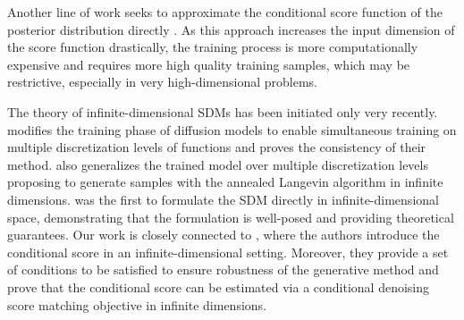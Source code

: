 \documentclass[10pt]{article} %
\theoremstyle{plain}
\theoremstyle{definition}
\theoremstyle{remark}
\begin{document}
Another line of work seeks to approximate the conditional score function of the posterior distribution directly \cite{saharia2021image,batzolis2021conditional,baldassari2024conditional}. As this approach increases the input dimension of the score function drastically, the training process is more computationally expensive and requires more high quality training samples, which may be restrictive, especially in very high-dimensional problems. 

The theory of infinite-dimensional SDMs has been initiated only very recently. 
\citet{hagemann2023multilevel} modifies the training phase of diffusion models to enable simultaneous training on multiple discretization levels of functions and proves the consistency of their method. \citet{lim2023score} also generalizes the trained model over multiple discretization levels proposing to generate samples with the annealed Langevin algorithm in infinite dimensions. \citet{pidstrigach2023infinitedimensional} was the first to formulate the SDM directly in infinite-dimensional space, demonstrating that the formulation is well-posed and providing theoretical guarantees. Our work is closely connected to \citet{baldassari2024conditional}, where the authors introduce the conditional score in an infinite-dimensional setting. Moreover, they provide a set of conditions to be satisfied to ensure robustness of the generative method and prove that the conditional score can be estimated via a conditional denoising score matching objective in infinite dimensions.
\end{document}
